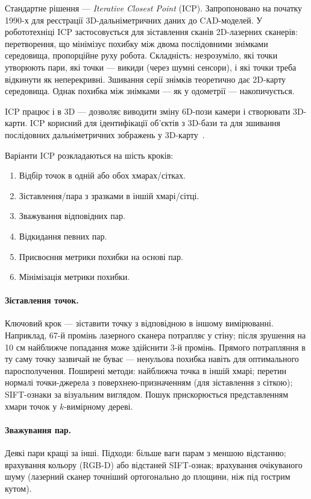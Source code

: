 Стандартне рішення — \emph{Iterative Closest Point} (ICP). Запропоновано на початку 1990-х для реєстрації 3D-дальніметричних даних до CAD-моделей. У робототехніці ICP застосовується для зіставлення сканів 2D-лазерних сканерів: перетворення, що мінімізує похибку між двома послідовними знімками середовища, пропорційне руху робота. Складність: незрозуміло, які точки утворюють пари, які точки — викиди (через шумні сенсори), і які точки треба відкинути як неперекривні. Зшивання серії знімків теоретично дає 2D-карту середовища. Однак похибка між знімками — як у одометрії — накопичується.

ICP працює і в 3D — дозволяє виводити зміну 6D-пози камери і створювати 3D-карти. ICP корисний для ідентифікації об'єктів з 3D-бази та для зшивання послідовних дальніметричних зображень у 3D-карту~\cite{henry2010rgb}.

Варіанти ICP розкладаються на шість кроків:
\begin{enumerate}
    \item Відбір точок в одній або обох хмарах/сітках.
    \item Зіставлення/пара з зразками в іншій хмарі/сітці.
    \item Зважування відповідних пар.
    \item Відкидання певних пар.
    \item Присвоєння метрики похибки на основі пар.
    \item Мінімізація метрики похибки.
\end{enumerate}

\paragraph{Зіставлення точок.}
Ключовий крок — зіставити точку з відповідною в іншому вимірюванні. Наприклад, 67-й промінь лазерного сканера потрапляє у стіну; після зрушення на 10 см найближче попадання може здійснити 3-й промінь. Прямого потрапляння в ту саму точку зазвичай не буває — ненульова похибка навіть для оптимального паросполучення. Поширені методи: найближча точка в іншій хмарі; перетин нормалі точки-джерела з поверхнею-призначенням (для зіставлення з сіткою); SIFT-ознаки за візуальним виглядом. Пошук прискорюється представленням хмари точок у $k$-вимірному дереві.

\paragraph{Зважування пар.}
Деякі пари кращі за інші. Підходи: більше ваги парам з меншою відстанню; врахування кольору (RGB-D) або відстаней SIFT-ознак; врахування очікуваного шуму (лазерний сканер точніший ортогонально до площини, ніж під гострим кутом).

